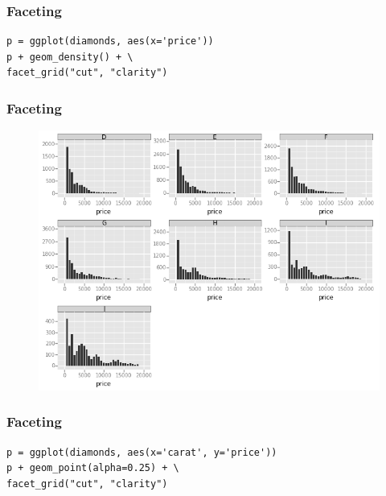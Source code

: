 \documentclass{beamer}
\begin{document}
\begin{frame}[fragile]
	\frametitle{Faceting}
	\begin{framed}
		\begin{verbatim}
p = ggplot(diamonds, aes(x='price'))
p + geom_density() + \
facet_grid("cut", "clarity")
		\end{verbatim}
		
	\end{framed}
\end{frame}
\begin{frame}
\frametitle{Faceting}
	\begin{figure}
		\centering
		\includegraphics[width=0.7\linewidth]{Facet3}
		\caption{}
		\label{fig:Facet3}
	\end{figure}
	
\end{frame}
\begin{frame}[fragile]
\frametitle{Faceting}
	\begin{framed}
		\begin{verbatim}
p = ggplot(diamonds, aes(x='carat', y='price'))
p + geom_point(alpha=0.25) + \
facet_grid("cut", "clarity")
	\end{verbatim}
	
\end{framed}
\end{frame}
\end{document}
